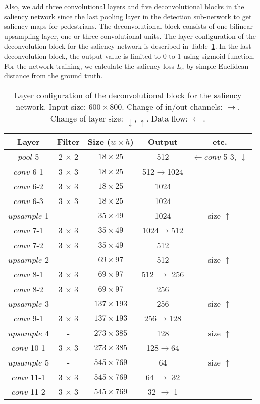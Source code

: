 \documentclass[journal]{IEEEtran}
\begin{document}
Also, we add three convolutional layers and five deconvolutional blocks in the saliency network since the last pooling layer in the detection sub-network to get saliency maps for pedestrians. The deconvolutional block consists of one bilinear upsampling layer, one or three convolutional units. The layer configuration of the deconvolution block for the saliency network is described in Table~\ref{table:deconv_block_details}. In the last deconvolution block, the output value is limited to 0 to 1 using sigmoid function. For the network training, we calculate the saliency loss $L_{s}$ by simple Euclidean distance from the ground truth.

\begin{table}[t]
\caption{Layer configuration of the deconvolutional block for the saliency network. Input size: $600 \times 800$. Change of in/out channels: $\to$. Change of layer size: $\downarrow, \uparrow$. Data flow: $\leftarrow$.}
\small\addtolength{\tabcolsep}{-3pt}
\begin{center}
\begin{tabular}[c]{|c|c|c|c|c|}
\hline
\bf{Layer} & \bf{Filter} & \bf{Size ($w\times h$)} & \bf{Output} & \bf{etc.}  \\
\hline
$pool$ 5    & 2 $\times$ 2 &  $18 \times 25 $ & 512 & $\leftarrow conv$ 5-3, $\downarrow$\\
$conv$ 6-1  & 3 $\times$ 3 &  $18 \times 25$ & 512$\to$1024 & \\
$conv$ 6-2  & 3 $\times$ 3 &  $18 \times 25$ & 1024 & \\
$conv$ 6-3  & 3 $\times$ 3 &  $18 \times 25$ & 1024 & \\
\hline
$upsample$ 1  & -          & $35 \times 49$  & 1024 & size $\uparrow$ \\
$conv$ 7-1  & 3 $\times$ 3 &  $35 \times 49$ & 1024$\to$512 & \\
$conv$ 7-2  & 3 $\times$ 3 &  $35 \times 49$ & 512 & \\
\hline
$upsample$ 2  & - & $69 \times 97$ & 512 & size $\uparrow$ \\
$conv$ 8-1  & 3 $\times$ 3 &  $69 \times 97$ & 512 $\to$ 256 & \\
$conv$ 8-2  & 3 $\times$ 3 &  $69 \times 97$ & 256 & \\
\hline
$upsample$ 3  & -          & $137 \times 193$  & 256 & size $\uparrow$ \\
$conv$ 9-1  & 3 $\times$ 3 &  $137 \times 193$ & 256$\to$128 & \\
\hline
$upsample$ 4  & -          & $273 \times 385$ & 128 & size $\uparrow$ \\
$conv$ 10-1  & 3 $\times$ 3 &  $273 \times 385$ & 128$\to$64 & \\
\hline
$upsample$ 5  & -          & $ 545\times 769$ & 64 & size $\uparrow$ \\
$conv$ 11-1  & 3 $\times$ 3 &  $545 \times 769$ & 64 $\to$ 32 & \\
$conv$ 11-2  & 3 $\times$ 3 &  $545 \times 769$ & 32 $\to$ 1 & \\
\hline
\end{tabular}
\end{center}
\label{table:deconv_block_details}
\end{table}
\end{document}
